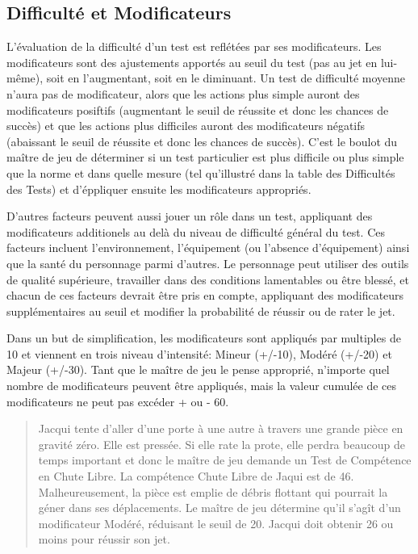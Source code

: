 \subsection{Difficulté et Modificateurs} \label{sec:difficulty-modifiers} 

L'évaluation de la difficulté d'un test est reflétées par ses modificateurs. Les modificateurs sont des ajustements apportés au seuil du test (pas au jet en lui-même), soit en l'augmentant, soit en le diminuant. Un test de difficulté moyenne n'aura pas de modificateur, alors que les actions plus simple auront des modificateurs posiftifs (augmentant le seuil de réussite et donc les chances de succès) et que les actions plus difficiles auront des modificateurs négatifs (abaissant le seuil de réussite et donc les chances de succès). C'est le boulot du maître de jeu de déterminer si un test particulier est plus difficile ou plus simple que la norme et dans quelle mesure (tel qu'illustré dans la table des Difficultés des Tests) et d'éppliquer ensuite les modificateurs appropriés. 

D'autres facteurs peuvent aussi jouer un rôle dans un test, appliquant des modificateurs additionels au delà du niveau de difficulté général du test. Ces facteurs incluent l'environnement, l'équipement (ou l'absence d'équipement) ainsi que la santé du personnage parmi d'autres. Le personnage peut utiliser des outils de qualité supérieure, travailler dans des conditions lamentables ou être blessé, et chacun de ces facteurs devrait être pris en compte, appliquant des modificateurs supplémentaires au seuil et modifier la probabilité de réussir ou de rater le jet. 

Dans un but de simplification, les modificateurs sont appliqués par multiples de 10 et viennent en trois niveau d'intensité: Mineur (+/-10), Modéré (+/-20) et Majeur (+/-30). Tant que le maître de jeu le pense approprié, n'importe quel nombre de modificateurs peuvent être appliqués, mais la valeur cumulée de ces modificateurs ne peut pas excéder + ou - 60. 

\begin{quotation} Jacqui tente d'aller d'une porte à une autre à travers une grande pièce en gravité zéro. Elle est pressée. Si elle rate la prote, elle perdra beaucoup de temps important et donc le maître de jeu demande un Test de Compétence en Chute Libre. La compétence Chute Libre de Jaqui est de 46. Malheureusement, la pièce est emplie de débris flottant qui pourrait la géner dans ses déplacements. Le maître de jeu détermine qu'il s'agît d'un modificateur Modéré, réduisant le seuil de 20. Jacqui doit obtenir 26 ou moins pour réussir son jet. \end{quotation} 

